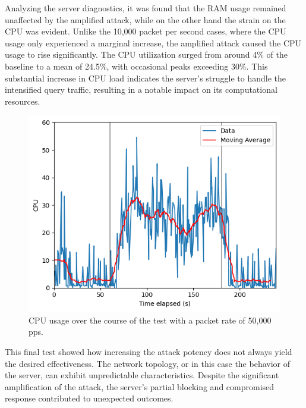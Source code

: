 \noindent Analyzing the server diagnostics, it was found that the RAM usage remained unaffected by the amplified attack, while on the other hand the strain on the CPU was evident. Unlike the 10,000 packet per second cases, where the CPU usage only experienced a marginal increase, the amplified attack caused the CPU usage to rise significantly. The CPU utilization surged from around 4\% of the baseline to a mean of 24.5\%, with occasional peaks exceeding 30\%. This substantial increase in CPU load indicates the server's struggle to handle the intensified query traffic, resulting in a notable impact on its computational resources.\\
\begin{figure}[H]
    \centering
    \includegraphics[width=\columnwidth]{Sections/Images/Server_CPU_ANY50.png}
    \caption{CPU usage over the course of the test with a packet rate of 50,000 pps.}
    \label{fig:Server_CPU_ANY50}
\end{figure}
\noindent This final test showed how increasing the attack potency does not always yield the desired effectiveness. The network topology, or in this case the behavior of the server, can exhibit unpredictable characteristics. Despite the significant amplification of the attack, the server's partial blocking and compromised response contributed to unexpected outcomes.\\
\\